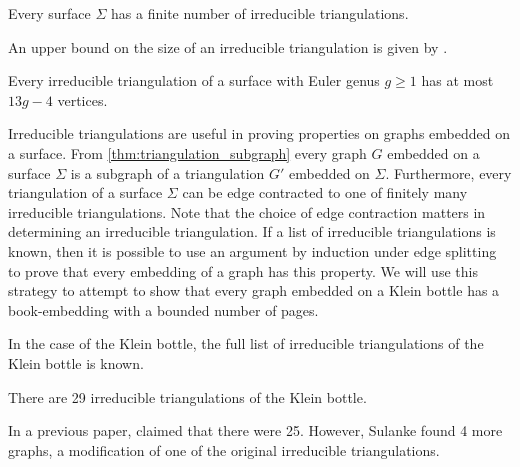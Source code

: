 \begin{theorem}
    Every surface $\Sigma$ has a finite number of irreducible triangulations.
\end{theorem}

An upper bound on the size of an irreducible triangulation is given by \textcite{joretIrreducibleTriangulationsAre2010}.

\begin{theorem}
    Every irreducible triangulation of a surface with Euler genus $g \geq 1$ has at most $13g - 4$ vertices. 
\end{theorem}

Irreducible triangulations are useful in proving properties on graphs embedded on a surface. From \cref{thm:triangulation_subgraph} every graph $G$ embedded on a surface $\Sigma$ is a subgraph of a triangulation $G'$ embedded on $\Sigma$. Furthermore, every triangulation of a surface $\Sigma$ can be edge contracted to one of finitely many irreducible triangulations. Note that the choice of edge contraction matters in determining an irreducible triangulation. If a list of irreducible triangulations is known, then it is possible to use an argument by induction under edge splitting to prove that every embedding of a graph has this property. We will use this strategy to attempt to show that every graph embedded on a Klein bottle has a book-embedding with a bounded number of pages. 

In the case of the Klein bottle, the full list of irreducible triangulations of the Klein bottle is known. 
\begin{theorem}
    There are 29 irreducible triangulations of the Klein bottle. 
\end{theorem} 
In a previous paper, \textcite{lawrencenkoIrreducibleTriangulationsKlein1997} claimed that there were 25. However, Sulanke found 4 more graphs, a modification of one of the original irreducible triangulations. 

